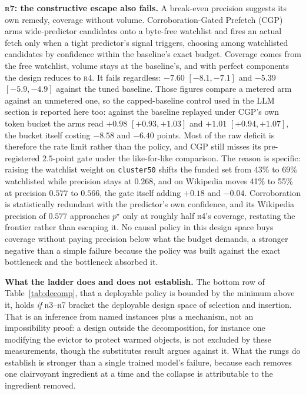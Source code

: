 \documentclass[letterpaper]{article} %
\newcommand{\rung}[1]{\textsc{#1}}
\begin{document}
\textbf{\rung{r7}: the constructive escape also fails.} A break-even precision suggests its own remedy, coverage without volume. Corroboration-Gated Prefetch (CGP) arms wide-predictor candidates onto a byte-free watchlist and fires an actual fetch only when a tight predictor's signal triggers, choosing among watchlisted candidates by confidence within the baseline's exact budget. Coverage comes from the free watchlist, volume stays at the baseline's, and with perfect components the design reduces to \rung{r4}. It fails regardless: $-7.60$ $[-8.1,-7.1]$ and $-5.39$ $[-5.9,-4.9]$ against the tuned baseline. Those figures compare a metered arm against an unmetered one, so the capped-baseline control used in the LLM section is reported here too: against the baseline replayed under CGP's own token bucket the arms read $+0.98$ $[+0.93,+1.03]$ and $+1.01$ $[+0.94,+1.07]$, the bucket itself costing $-8.58$ and $-6.40$ points. Most of the raw deficit is therefore the rate limit rather than the policy, and CGP still misses its pre-registered $2.5$-point gate under the like-for-like comparison. The reason is specific: raising the watchlist weight on \texttt{cluster50} shifts the funded set from 43\% to 69\% watchlisted while precision stays at $0.268$, and on Wikipedia moves 41\% to 55\% at precision $0.577$ to $0.566$, the gate itself adding $+0.18$ and $-0.04$. Corroboration is statistically redundant with the predictor's own confidence, and its Wikipedia precision of $0.577$ approaches $p^{\star}$ only at roughly half \rung{r4}'s coverage, restating the frontier rather than escaping it. No causal policy in this design space buys coverage without paying precision below what the budget demands, a stronger negative than a simple failure because the policy was built against the exact bottleneck and the bottleneck absorbed it.

\textbf{What the ladder does and does not establish.} The bottom row of Table~\ref{tab:decomp}, that a deployable policy is bounded by the minimum above it, holds \emph{if} \rung{r3}--\rung{r7} bracket the deployable design space of selection and insertion. That is an inference from named instances plus a mechanism, not an impossibility proof: a design outside the decomposition, for instance one modifying the evictor to protect warmed objects, is not excluded by these measurements, though the substitutes result argues against it. What the rungs do establish is stronger than a single trained model's failure, because each removes one clairvoyant ingredient at a time and the collapse is attributable to the ingredient removed.
\end{document}

